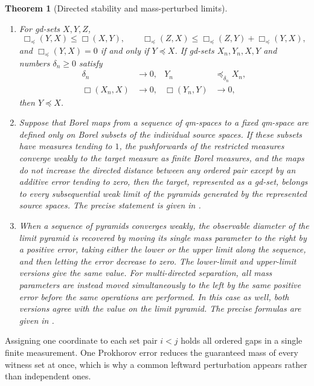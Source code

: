 \documentclass{amsart}
\theoremstyle{plain}
\newtheorem{theorem}{Theorem}[section]
\theoremstyle{definition}
\theoremstyle{remark}
\begin{document}
\begin{theorem}[Directed stability and mass-perturbed limits]
\label{thm:intro-directed-stability}
\begin{enumerate}[label=\textup{(\roman*)}]
\item For gd-sets $X,Y,Z$,
\[ \Box_{\preceq}(Y,X)\leq\Box(X,Y),\qquad \Box_{\preceq}(Z,X)\leq\Box_{\preceq}(Z,Y)+\Box_{\preceq}(Y,X), \]
and $\Box_{\preceq}(Y,X)=0$ if and only if $Y\preceq X$.  If gd-sets
$X_n,Y_n,X,Y$ and numbers $\delta_n\geq0$ satisfy
\begin{align*}
\delta_n&\longrightarrow0,&
Y_n&\preceq_{\delta_n}X_n,\\
\Box(X_n,X)&\longrightarrow0,&
\Box(Y_n,Y)&\longrightarrow0,
\end{align*}
then $Y\preceq X$.
\item Suppose that Borel maps from a sequence of qm-spaces to a fixed
qm-space are defined only on Borel subsets of the individual source spaces.
If these subsets have measures tending to $1$, the pushforwards of the
restricted measures converge weakly to the target measure as finite Borel
measures, and the maps do not increase the directed distance between any
ordered pair except by an additive error tending to zero, then the target,
represented as a gd-set, belongs to every subsequential weak limit of the
pyramids generated by the represented source spaces.  The precise statement
is given in .
\item When a sequence of pyramids converges weakly, the observable diameter
of the limit pyramid is recovered by moving its single mass parameter to the
right by a positive error, taking either the lower or the upper limit along
the sequence, and then letting the error decrease to zero.  The lower-limit
and upper-limit versions give the same value.  For multi-directed separation,
all mass parameters are instead moved simultaneously to the left by the same
positive error before the same operations are performed.  In this case as
well, both versions agree with the value on the limit pyramid.  The precise
formulas are given in
.
\end{enumerate}
\end{theorem}

Assigning one coordinate to each set pair $i<j$ holds all ordered gaps in a
single finite measurement.  One Prokhorov error reduces the guaranteed mass
of every witness set at once, which is why a common leftward perturbation
appears rather than independent ones.
\end{document}

